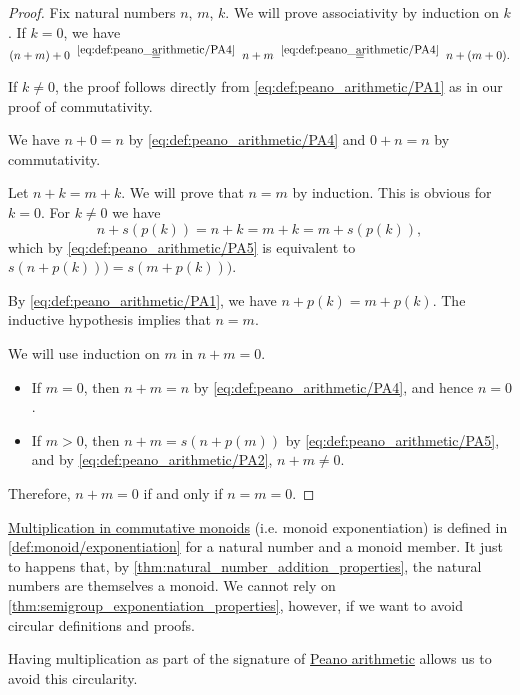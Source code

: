 \begin{proof}
   Fix natural numbers \( n \), \( m \), \( k \). We will prove associativity by induction on \( k \). If \( k = 0 \), we have
  \begin{equation*}
    (n + m) + 0
    \reloset {\eqref{eq:def:peano_arithmetic/PA4}} =
    n + m
    \reloset {\eqref{eq:def:peano_arithmetic/PA4}} =
    n + (m + 0).
  \end{equation*}

  If \( k \neq 0 \), the proof follows directly from \eqref{eq:def:peano_arithmetic/PA1} as in our proof of commutativity.

   We have \( n + 0 = n \) by \eqref{eq:def:peano_arithmetic/PA4} and \( 0 + n = n \) by commutativity.

   Let \( n + k = m + k \). We will prove that \( n = m \) by induction. This is obvious for \( k = 0 \). For \( k \neq 0 \) we have
  \begin{equation*}
    n + s(p(k))
    =
    n + k
    =
    m + k
    =
    m + s(p(k)),
  \end{equation*}
  which by \eqref{eq:def:peano_arithmetic/PA5} is equivalent to \( s(n + p(k))) = s(m + p(k))) \).

  By \eqref{eq:def:peano_arithmetic/PA1}, we have \( n + p(k) = m + p(k) \). The inductive hypothesis implies that \( n = m \).

   We will use induction on \( m \) in \( n + m = 0 \).
  \begin{itemize}
    \item If \( m = 0 \), then \( n + m = n \) by \eqref{eq:def:peano_arithmetic/PA4}, and hence \( n = 0 \).

    \item If \( m > 0 \), then \( n + m = s(n + p(m)) \) by \eqref{eq:def:peano_arithmetic/PA5}, and by \eqref{eq:def:peano_arithmetic/PA2}, \( n + m \neq 0 \).
  \end{itemize}

  Therefore, \( n + m = 0 \) if and only if \( n = m = 0 \).
\end{proof}

\begin{remark}\label{rem:natural_number_multiplication}
  \hyperref[con:additive_semigroup/multiplication]{Multiplication in commutative monoids} (i.e. monoid exponentiation) is defined in \cref{def:monoid/exponentiation} for a natural number and a monoid member. It just to happens that, by \cref{thm:natural_number_addition_properties}, the natural numbers are themselves a monoid. We cannot rely on \cref{thm:semigroup_exponentiation_properties}, however, if we want to avoid circular definitions and proofs.

  Having multiplication as part of the signature of \hyperref[def:peano_arithmetic]{Peano arithmetic} allows us to avoid this circularity.
\end{remark}

